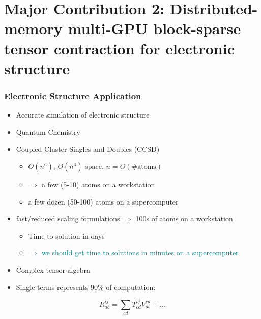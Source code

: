 \section[Major Contribution 2]{Major Contribution 2: Distributed-memory multi-GPU block-sparse tensor contraction for electronic structure}

\begin{frame}[t]
  \frametitle{Electronic Structure Application}

  \begin{itemize}
  \item Accurate simulation of electronic structure
  \item Quantum Chemistry
  \item Coupled Cluster Singles and Doubles (CCSD)
    \begin{itemize}
    \item $O(n^6)$, $O(n^4)$ space. $n = O(\textrm{\# atoms})$
    \item $\Rightarrow$ a few (5-10) atoms on a workstation
    \item a few dozen (50-100) atoms on a supercomputer
    \end{itemize}
  \item fast/reduced scaling formulations $\Rightarrow$ 100s of atoms on a workstation
    \begin{itemize}
    \item Time to solution in days
    \item \textcolor{teal}{$\Rightarrow$ we should get time to solutions in minutes on a supercomputer}
    \end{itemize}
  \item Complex tensor algebra
  \item Single terms represents 90\% of computation:
  \end{itemize}

  $$
  R_{ab}^{ij} = \sum_{cd} T_{cd}^{ij}V_{ab}^{cd} + \ldots
  $$
  
\end{frame}


